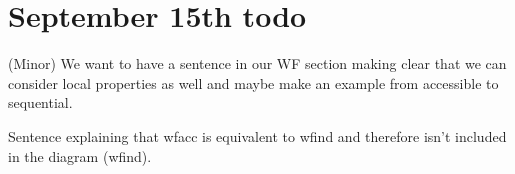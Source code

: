 \documentclass{article}
\begin{document}
\section*{September 15th todo}
\begin{todolist}
  \item (Minor) We want to have a sentence in our WF section making clear that we can consider local properties as well and maybe make an example from accessible to sequential. 
  \item Sentence explaining that wfacc is equivalent to wfind and therefore isn't included in the diagram (wfind).
  \item 
\end{todolist}
\end{document}
